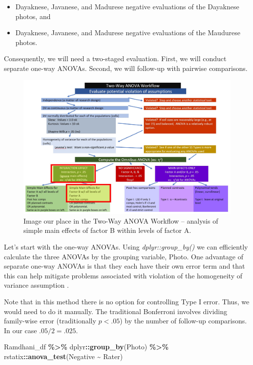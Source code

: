 \documentclass[
  11pt,
]{book}
\newenvironment{Shaded}{\begin{snugshade}}{\end{snugshade}}
\newcommand{\FunctionTok}[1]{\textcolor[rgb]{0.27,0.27,0.27}{\textbf{#1}}}
\newcommand{\NormalTok}[1]{#1}
\newcommand{\SpecialCharTok}[1]{\textcolor[rgb]{0.43,0.43,0.43}{\textbf{#1}}}
\providecommand{\tightlist}{%
  \setlength{\itemsep}{0pt}\setlength{\parskip}{0pt}}
\begin{document}
\begin{itemize}
\tightlist
\item
  Dayaknese, Javanese, and Madurese negative evaluations of the Dayaknese photos, and
\item
  Dayaknese, Javanese, and Madurese negative evaluations of the Maudurese photos.
\end{itemize}

Consequently, we will need a two-staged evaluation. First, we will conduct separate one-way ANOVAs. Second, we will follow-up with pairwise comparisons.

\begin{figure}
\centering
\includegraphics{images/factorial/WrkFlo_IntSmp2.jpg}
\caption{Image our place in the Two-Way ANOVA Workflow -- analysis of simple main effects of factor B within levels of factor A.}
\end{figure}

Let's start with the one-way ANOVAs. Using \emph{dplyr::group\_by()} we can efficiently calculate the three ANOVAs by the grouping variable, Photo. One advantage of separate one-way ANOVAs is that they each have their own error term and that this can help mitigate problems associated with violation of the homogeneity of variance assumption \citep{kassambara_anova_nodate}.

Note that in this method there is no option for controlling Type I error. Thus, we would need to do it manually. The traditional Bonferroni involves dividing family-wise error (traditionally \(p < .05\)) by the number of follow-up comparisons. In our case \(.05/2 = .025\).

\begin{Shaded}
\begin{Highlighting}[]
\NormalTok{Ramdhani\_df }\SpecialCharTok{\%\textgreater{}\%}
\NormalTok{    dplyr}\SpecialCharTok{::}\FunctionTok{group\_by}\NormalTok{(Photo) }\SpecialCharTok{\%\textgreater{}\%}
\NormalTok{    rstatix}\SpecialCharTok{::}\FunctionTok{anova\_test}\NormalTok{(Negative }\SpecialCharTok{\textasciitilde{}}\NormalTok{ Rater)}
\end{Highlighting}
\end{Shaded}
\end{document}

